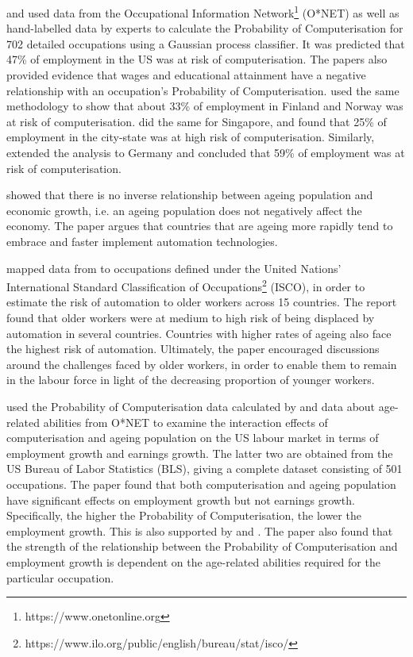 \documentclass[11pt]{article}
\begin{document}
\cite{futureofemployment} and \cite{osborne2017future} used data from the Occupational Information Network\footnote{https://www.onetonline.org} (O*NET) as well as hand-labelled data by experts to calculate the Probability of Computerisation for 702 detailed occupations using a Gaussian process classifier. It was predicted that 47\% of employment in the US was at risk of computerisation. The papers also provided evidence that wages and educational attainment have a negative relationship with an occupation’s Probability of Computerisation. \cite{pajarinen2015computerization} used the same methodology to show that about 33\% of employment in Finland and Norway was at risk of computerisation. \cite{fuei2017automation} did the same for Singapore, and found that 25\% of employment in the city-state was at high risk of computerisation. Similarly, \cite{brzeski2015roboter} extended the analysis to Germany and concluded that 59\% of employment was at risk of computerisation.

\cite{10.1257/aer.p20171101} showed that there is no inverse relationship between ageing population and economic growth, i.e. an ageing population does not negatively affect the economy. The paper argues that countries that are ageing more rapidly tend to embrace and faster implement automation technologies.

\cite{twinthreats} mapped data from \cite{osborne2017future} to occupations defined under the United Nations' International Standard Classification of Occupations\footnote{https://www.ilo.org/public/english/bureau/stat/isco/} (ISCO), in order to estimate the risk of automation to older workers across 15 countries. The report found that older workers were at medium to high risk of being displaced by automation in several countries. Countries with higher rates of ageing also face the highest risk of automation. Ultimately, the paper encouraged discussions around the challenges faced by older workers, in order to enable them to remain in the labour force in light of the decreasing proportion of younger workers.

\cite{10.1371/journal.pone.0263704} used the Probability of Computerisation data calculated by \cite{osborne2017future} and data about age-related abilities from O*NET to examine the interaction effects of computerisation and ageing population on the US labour market in terms of employment growth and earnings growth. The latter two are obtained from the US Bureau of Labor Statistics (BLS), giving a complete dataset consisting of 501 occupations. The paper found that both computerisation and ageing population have significant effects on employment growth but not earnings growth. Specifically, the higher the Probability of Computerisation, the lower the employment growth. This is also supported by \cite{graetz2018robots} and \cite{acemoglu2020robots}. The paper also found that the strength of the relationship between the Probability of Computerisation and employment  growth is dependent on the age-related abilities required for the particular occupation.
\end{document}

